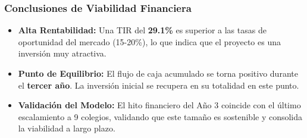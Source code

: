 \begin{frame}
  \frametitle{Conclusiones de Viabilidad Financiera}

  \begin{itemize}
    \item<1-> \textbf{Alta Rentabilidad:} Una TIR del \textbf{29.1\%} es
      superior a las tasas de oportunidad del mercado (15-20\%), lo que
      indica que el proyecto es una inversión muy atractiva.
      \vspace{2em}

    \item<2-> \textbf{Punto de Equilibrio:} El flujo de caja acumulado se
      torna positivo durante el \textbf{tercer año}. La inversión inicial se
      recupera en su totalidad en este punto.
      \vspace{2em}

    \item<3-> \textbf{Validación del Modelo:} El hito financiero del Año 3
      coincide con el último escalamiento a 9 colegios, validando que este
      tamaño es sostenible y consolida la viabilidad a largo plazo.
  \end{itemize}
\end{frame}
